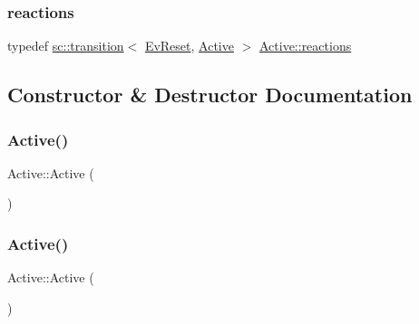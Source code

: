 \mbox{\label{struct_active_a86282569cdd6a34df7d2580364c79857}} 
\subsubsection{\texorpdfstring{reactions}{reactions}\hspace{0.1cm}{\footnotesize\ttfamily [4/4]}}
{\footnotesize\ttfamily typedef \mbox{\hyperlink{classboost_1_1statechart_1_1transition}{sc\+::transition}}$<$ \mbox{\hyperlink{struct_ev_reset}{Ev\+Reset}}, \mbox{\hyperlink{struct_active}{Active}} $>$ \mbox{\hyperlink{struct_active_a628dd827d0faf3cd002f59a8d17f189d}{Active\+::reactions}}}



\subsection{Constructor \& Destructor Documentation}
\mbox{\label{struct_active_aa276bfdc4f8f0ec3fd8a8a3a2cedab1e}} 
\subsubsection{\texorpdfstring{Active()}{Active()}\hspace{0.1cm}{\footnotesize\ttfamily [1/2]}}
{\footnotesize\ttfamily Active\+::\+Active (\begin{DoxyParamCaption}{ }\end{DoxyParamCaption})\hspace{0.3cm}{\ttfamily [inline]}}

\mbox{\label{struct_active_aa276bfdc4f8f0ec3fd8a8a3a2cedab1e}} 
\subsubsection{\texorpdfstring{Active()}{Active()}\hspace{0.1cm}{\footnotesize\ttfamily [2/2]}}
{\footnotesize\ttfamily Active\+::\+Active (\begin{DoxyParamCaption}{ }\end{DoxyParamCaption})\hspace{0.3cm}{\ttfamily [inline]}}



